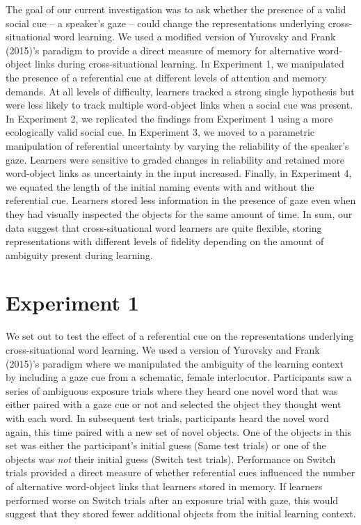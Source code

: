 \documentclass[oneside]{report}
\begin{document}
The goal of our current investigation was to ask whether the presence of
a valid social cue -- a speaker's gaze -- could change the
representations underlying cross-situational word learning. We used a
modified version of Yurovsky and Frank (2015)'s paradigm to provide a
direct measure of memory for alternative word-object links during
cross-situational learning. In Experiment 1, we manipulated the presence
of a referential cue at different levels of attention and memory
demands. At all levels of difficulty, learners tracked a strong single
hypothesis but were less likely to track multiple word-object links when
a social cue was present. In Experiment 2, we replicated the findings
from Experiment 1 using a more ecologically valid social cue. In
Experiment 3, we moved to a parametric manipulation of referential
uncertainty by varying the reliability of the speaker's gaze. Learners
were sensitive to graded changes in reliability and retained more
word-object links as uncertainty in the input increased. Finally, in
Experiment 4, we equated the length of the initial naming events with
and without the referential cue. Learners stored less information in the
presence of gaze even when they had visually inspected the objects for
the same amount of time. In sum, our data suggest that cross-situational
word learners are quite flexible, storing representations with different
levels of fidelity depending on the amount of ambiguity present during
learning.

\hypertarget{experiment-1}{%
\section{Experiment 1}\label{experiment-1}}

We set out to test the effect of a referential cue on the
representations underlying cross-situational word learning. We used a
version of Yurovsky and Frank (2015)'s paradigm where we manipulated the
ambiguity of the learning context by including a gaze cue from a
schematic, female interlocutor. Participants saw a series of ambiguous
exposure trials where they heard one novel word that was either paired
with a gaze cue or not and selected the object they thought went with
each word. In subsequent test trials, participants heard the novel word
again, this time paired with a new set of novel objects. One of the
objects in this set was either the participant's initial guess (Same
test trials) or one of the objects was \emph{not} their initial guess
(Switch test trials). Performance on Switch trials provided a direct
measure of whether referential cues influenced the number of alternative
word-object links that learners stored in memory. If learners performed
worse on Switch trials after an exposure trial with gaze, this would
suggest that they stored fewer additional objects from the initial
learning context.
\end{document}

